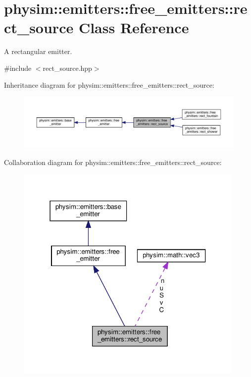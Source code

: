 \hypertarget{classphysim_1_1emitters_1_1free__emitters_1_1rect__source}{}\section{physim\+:\+:emitters\+:\+:free\+\_\+emitters\+:\+:rect\+\_\+source Class Reference}
\label{classphysim_1_1emitters_1_1free__emitters_1_1rect__source}


A rectangular emitter.  




{\ttfamily \#include $<$rect\+\_\+source.\+hpp$>$}



Inheritance diagram for physim\+:\+:emitters\+:\+:free\+\_\+emitters\+:\+:rect\+\_\+source\+:\nopagebreak
\begin{figure}[H]
\begin{center}
\leavevmode
\includegraphics[width=350pt]{classphysim_1_1emitters_1_1free__emitters_1_1rect__source__inherit__graph}
\end{center}
\end{figure}


Collaboration diagram for physim\+:\+:emitters\+:\+:free\+\_\+emitters\+:\+:rect\+\_\+source\+:\nopagebreak
\begin{figure}[H]
\begin{center}
\leavevmode
\includegraphics[width=316pt]{classphysim_1_1emitters_1_1free__emitters_1_1rect__source__coll__graph}
\end{center}
\end{figure}
